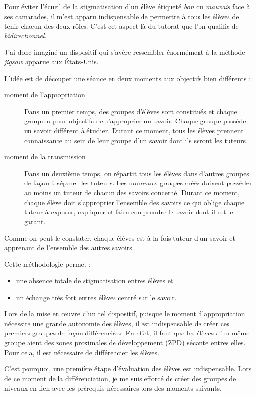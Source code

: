 Pour éviter l'écueil de la stigmatisation d'un élève étiqueté \emph{bon} ou \emph{mauvais} face à ses camarades, il m'est apparu indispensable de permettre à tous les élèves de tenir chacun des deux rôles. C'est cet aspect là du tutorat que l'on qualifie de \emph{bidirectionnel}.

J'ai donc imaginé un dispositif qui s'avère ressembler énormément à la méthode \emph{jigsaw} apparue aux États-Unis.

L'idée est de découper une séance en deux moments aux objectifs bien différents :

\begin{description}
    \item[moment de l'appropriation] Dans un premier temps, des groupes d'élèves sont constitués et chaque groupe a pour objectifs de s'approprier un savoir. Chaque groupe possède un savoir différent à étudier. Durant ce moment, tous les élèves prennent connaissance au sein de leur groupe d'un savoir dont ils seront les tuteurs.
    \item[moment de la transmission] Dans un deuxième temps, on répartit tous les élèves dans d'autres groupes de façon à séparer les tuteurs. Les nouveaux groupes créés doivent posséder au moins un tuteur de chacun des savoirs concerné. Durant ce moment, chaque élève doit s'approprier l'ensemble des savoirs ce qui oblige chaque tuteur à exposer, expliquer et faire comprendre le savoir dont il est le garant.
\end{description}

Comme on peut le constater, chaque élèves est à la fois tuteur d'un savoir et apprenant de l'ensemble des autres savoirs.

Cette méthodologie permet :

\begin{itemize}
    \item une absence totale de stigmatisation entres élèves et 
    \item un échange très fort entres élèves centré sur le savoir.
\end{itemize}


Lors de la mise en œuvre d'un tel dispositif, puisque le moment d'appropriation nécessite une grande autonomie des élèves, il est indispensable de créer ces premiers groupes de façon différenciées. En effet, il faut que les élèves d'un même groupe aient des zones proximales de développement (ZPD) sécante entres elles. Pour cela, il est nécessaire de différencier les élèves.

C'est pourquoi, une première étape d'évaluation des élèves est indispensable. Lors de ce moment de la différenciation, je me suis efforcé de créer des groupes de niveaux en lien avec les prérequis nécessaires lors des moments suivants.

